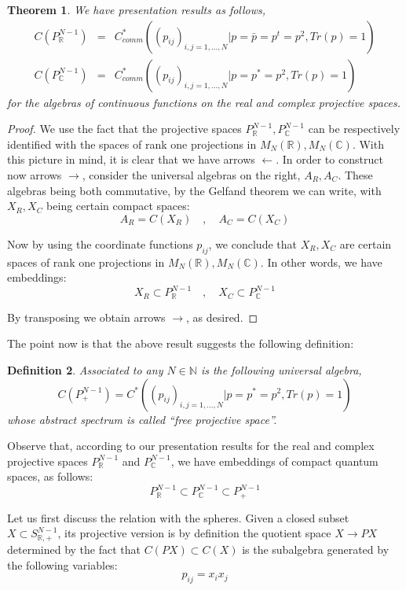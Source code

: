 \documentclass[12pt]{amsbook}
\newtheorem{theorem}{Theorem}[chapter]
\newtheorem{definition}[theorem]{Definition}
\begin{document}

\begin{theorem}
We have presentation results as follows,
\begin{eqnarray*}
C(P^{N-1}_\mathbb R)&=&C^*_{comm}\left((p_{ij})_{i,j=1,\ldots,N}\Big|p=\bar{p}=p^t=p^2,Tr(p)=1\right)\\
C(P^{N-1}_\mathbb C)&=&C^*_{comm}\left((p_{ij})_{i,j=1,\ldots,N}\Big|p=p^*=p^2,Tr(p)=1\right)
\end{eqnarray*}
for the algebras of continuous functions on the real and complex projective spaces.
\end{theorem}

\begin{proof}
We use the fact that the projective spaces $P^{N-1}_\mathbb R,P^{N-1}_\mathbb C$ can be respectively identified with the spaces of rank one projections in $M_N(\mathbb R),M_N(\mathbb C)$. With this picture in mind, it is clear that we have arrows $\leftarrow$. In order to construct now arrows $\to$, consider the universal algebras on the right, $A_R,A_C$. These algebras being both commutative, by the Gelfand theorem we can write, with $X_R,X_C$ being certain compact spaces:
$$A_R=C(X_R)\quad,\quad 
A_C=C(X_C)$$

Now by using the coordinate functions $p_{ij}$, we conclude that $X_R,X_C$ are certain spaces of rank one projections in $M_N(\mathbb R),M_N(\mathbb C)$. In other words, we have embeddings:
$$X_R\subset P^{N-1}_\mathbb R\quad,\quad 
X_C\subset P^{N-1}_\mathbb C$$

By transposing we obtain arrows $\to$, as desired.
\end{proof}

The point now is that the above result suggests the following definition:

\begin{definition}
Associated to any $N\in\mathbb N$ is the following universal algebra,
$$C(P^{N-1}_+)=C^*\left((p_{ij})_{i,j=1,\ldots,N}\Big|p=p^*=p^2,Tr(p)=1\right)$$
whose abstract spectrum is called ``free projective space''.
\end{definition}

Observe that, according to our presentation results for the real and complex projective spaces $P^{N-1}_\mathbb R$ and $P^{N-1}_\mathbb C$, we have embeddings of compact quantum spaces, as follows:
$$P^{N-1}_\mathbb R\subset P^{N-1}_\mathbb C\subset P^{N-1}_+$$

Let us first discuss the relation with the spheres. Given a closed subset $X\subset S^{N-1}_{\mathbb R,+}$, its projective version is by definition the quotient space $X\to PX$ determined by the fact that $C(PX)\subset C(X)$ is the subalgebra generated by the following variables:
$$p_{ij}=x_ix_j$$
\end{document}
